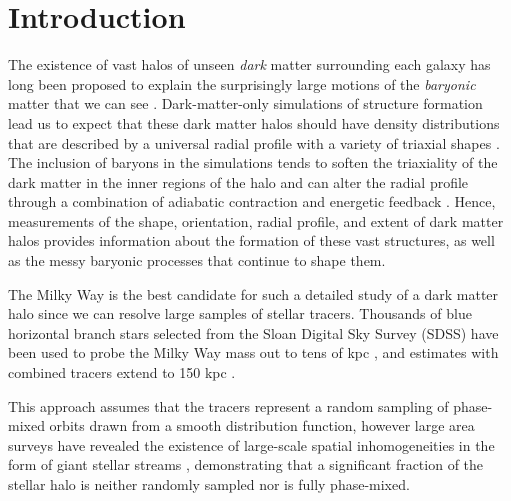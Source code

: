 \newcommand{\argmin}{\rm argmin}

\section{Introduction}
\label{intro.sec}
The existence of vast halos of unseen {\it dark} matter surrounding each galaxy has long been proposed to explain the surprisingly large
motions of the {\it baryonic} matter that we can see \citep[e.g.,][]{rubin70}.
Dark-matter-only simulations of structure formation lead us to expect that these dark matter halos should have density distributions that are described by a universal radial profile \citep{navarro96} with a variety of triaxial shapes \citep{jing02}.
The inclusion of baryons in the simulations tends to soften the triaxiality of the dark matter in the inner regions of the halo \citep[e.g., as the disk forms,][]{bailin05} and
can alter the radial profile through a combination of adiabatic contraction and energetic feedback \citep[e.g.][]{pontzen12}.
Hence, measurements of the shape, orientation, radial profile, and extent of dark matter halos provides information about the formation of these vast structures, as well as the messy baryonic processes that continue to shape them.

The Milky Way is the best candidate for such a detailed study of a dark matter halo
since we can resolve large samples of stellar tracers.
Thousands of blue horizontal branch stars selected from the Sloan Digital Sky Survey (SDSS) have been used to probe the Milky Way mass out to tens of
kpc \citep[SDSS, see][]{deason12a,kafle12}, and estimates with combined tracers extend to 150 kpc \citep{deason12b}.

This approach assumes that the tracers represent a random sampling of phase-mixed orbits drawn from a smooth distribution function, however large area surveys have revealed the existence of large-scale spatial inhomogeneities in the form of giant stellar streams \citep{newberg02,majewski03,belokurov06}, demonstrating that a significant fraction of the stellar halo is neither randomly sampled nor is fully phase-mixed.

